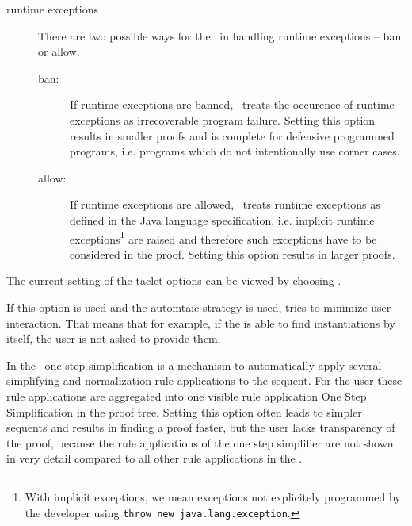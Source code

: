 \begin{description}
\begin{description}
\begin{description}
     
     \item[runtime exceptions] There are two possible ways for the \kp\ in
     handling runtime exceptions -- \textsf{ban} or \textsf{allow}.
     \begin{description}
      \item[ban:] If runtime exceptions are banned, \KeY\ treats the occurence of
      runtime exceptions as irrecoverable program failure. Setting this option
      results in smaller proofs and is complete for defensive programmed programs, i.e.
      programs which do not intentionally use corner cases. 
     
      \item[allow:] If runtime exceptions are allowed, \KeY\ treats 
      runtime exceptions as defined in the Java language specification, i.e.
      implicit runtime exceptions\footnote{With implicit exceptions, we mean 
      exceptions not explicitely programmed by the developer using 
      \texttt{throw new java.lang.exception}.}
      are raised and therefore such exceptions have to be considered in the proof.
      Setting this option results in larger proofs.
     \end{description}

    \end{description}

    The current setting of the taclet options can be viewed by choosing
    .
   \item[\meb{}{Minimize Interaction}] If this option is used and the automtaic strategy is used, 
   \KeY{} tries to minimize user interaction. That means that for example, 
   if the \kp{} is able to find instantiations by itself, the user is not asked to provide them.
   \item[\meb{}{Right Click for Macros}]
   \item[\meb{}{One Step Simplification}] In the \kp\ one step simplification 
   is a mechanism to automatically apply several simplifying and normalization rule applications to the sequent. 
   For the user these rule applications are aggregated 
   into one visible rule application \textsf{One Step Simplification} 
   in the proof tree.
   Setting this option often leads to simpler sequents and results in finding a proof faster,
   but the user lacks
   transparency of the proof, because the rule applications of the one step simplifier
   are not shown in very detail compared to all other rule applications in the \kp.
  

\end{description}
\end{description}
